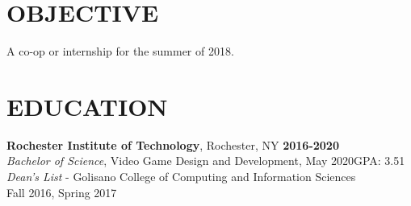 \documentclass[line,margin]{res}
\begin{document}

\noindent
\makebox[0pt][l]{}%
\makebox[\textwidth][c]{}%
\makebox[0pt][l]{}%
\makebox[\textwidth][c]{}%
\makebox[0pt][l]{}%
\makebox[\textwidth][c]{}%



\begin{resume}

\section{OBJECTIVE}
A co-op or internship for the summer of 2018.



\section{EDUCATION}
\textbf{Rochester Institute of Technology}, Rochester, NY\hfill
    \textbf{2016-2020}\\
{\sl Bachelor of Science}, Video Game Design and Development, May 2020\hfill GPA: 3.51
\\
{\sl Dean's List} - Golisano College of Computing and Information Sciences\hfill \\ Fall 2016, Spring 2017

\end{resume}
\end{document}
